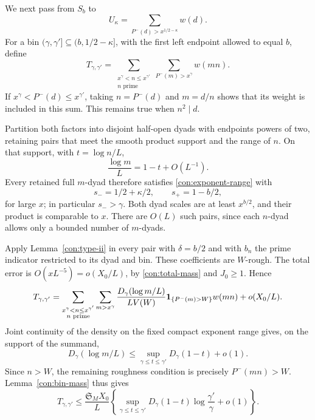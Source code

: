 We next pass from \(S_b\) to
\[
 U_\kappa=\sum_{P^-(d)>x^{1/2-\kappa}}w(d).
\]
For a bin \((\gamma,\gamma']\subseteq(b,1/2-\kappa]\), with the
first left endpoint allowed to equal \(b\), define
\[
 T_{\gamma,\gamma'}=
 \sum_{\substack{x^\gamma<n\le x^{\gamma'}\\n\text{ prime}}}
                    \sum_{P^-(m)>x^\gamma}w(mn).
\]
If \(x^\gamma<P^-(d)\le x^{\gamma'}\), taking \(n=P^-(d)\)
and \(m=d/n\) shows that its weight is included in this sum.
This remains true when \(n^2\mid d\).

Partition both factors into disjoint half-open dyads with endpoints
powers of two, retaining pairs that meet the smooth product support
and the range of \(n\).  On that support, with \(t=\log n/L\),
\[
 \frac{\log m}{L}=1-t+O(L^{-1}).
\]
Every retained full \(m\)-dyad therefore satisfies
\eqref{con:exponent-range} with
\[
 s_-=1/2+\kappa/2,\qquad s_+=1-b/2,
\]
for large \(x\); in particular \(s_->\gamma\).
Both dyad scales are at least \(x^{b/2}\), and their product is
comparable to \(x\).  There are \(O(L)\) such pairs, since each
\(n\)-dyad allows only a bounded number of \(m\)-dyads.

Apply Lemma~\ref{con:type-ii} in every pair with \(\delta=b/2\)
and with \(b_n\) the prime indicator restricted to its dyad and
bin.  These coefficients are \(W\)-rough.  The total error is
\(O(xL^{-5})=o(X_0/L)\), by \eqref{con:total-mass} and
\(J_0\ge1\).  Hence
\[
 T_{\gamma,\gamma'}=
 \sum_{\substack{x^\gamma<n\le x^{\gamma'}\\n\text{ prime}}}
 \sum_{m>x^\gamma}\frac{D_\gamma(\log m/L)}{LV(W)}
                         \mathbf{1}_{\{P^-(m)>W\}}w(mn)+o(X_0/L).
\]
Joint continuity of the density on the fixed compact exponent range
gives, on the support of the summand,
\[
 D_\gamma(\log m/L)
       \le\sup_{\gamma\le t\le\gamma'}D_\gamma(1-t)+o(1).
\]
Since \(n>W\), the remaining roughness condition is precisely
\(P^-(mn)>W\).  Lemma~\ref{con:bin-mass} thus gives
\begin{equation}\label{con:bin-cost}
 T_{\gamma,\gamma'}\le\frac{\mathfrak S_M X_0}{L}
 \left\{\sup_{\gamma\le t\le\gamma'}D_\gamma(1-t)
                       \log\frac{\gamma'}\gamma+o(1)\right\}.
\end{equation}

